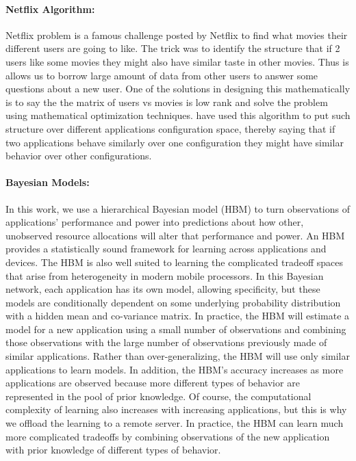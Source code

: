 \paragraph{Netflix Algorithm:}
Netflix problem is a famous challenge posted by Netflix to find what movies 
their different users are going to like. The trick was to identify 
the structure that if 2 users like some movies they might also have 
similar taste in other movies. Thus is allows us to borrow large amount of data from
other users to answer some questions about a new user.
One of the 
solutions in designing this mathematically is to say the the matrix of 
users vs movies is low rank and solve the problem using mathematical optimization techniques.\cite{delimitrou2013paragon} have used this algorithm to put 
such structure over different applications configuration space, thereby 
saying that if two applications behave similarly over one configuration they might have similar behavior over other configurations. 


\paragraph{ Bayesian Models:} In this work, we use a hierarchical Bayesian model (HBM) to turn observations of applications' performance and power into predictions
about how other, unobserved resource allocations will alter that
performance and power.  An HBM provides a
statistically sound framework for learning across applications and
devices.  The HBM is also well suited to learning the complicated
tradeoff spaces that arise from heterogeneity in modern mobile
processors. In this Bayesian network, each
application has its own model, allowing specificity, but these models
are conditionally dependent on some underlying probability
distribution with a hidden mean and co-variance matrix.  In practice,
the HBM will estimate a model for a new application using a small
number of observations and combining those observations with the large
number of observations previously made of similar applications.
Rather than over-generalizing, the HBM will use only similar
applications to learn models.  In addition, the HBM's accuracy
increases as more applications are observed because more different
types of behavior are represented in the pool of prior knowledge.  Of
course, the computational complexity of learning also increases with
increasing applications, but this is why we offload the learning to a
remote server. In
practice, the HBM can learn much more complicated tradeoffs by
combining observations of the new application with prior knowledge of
different types of behavior.



